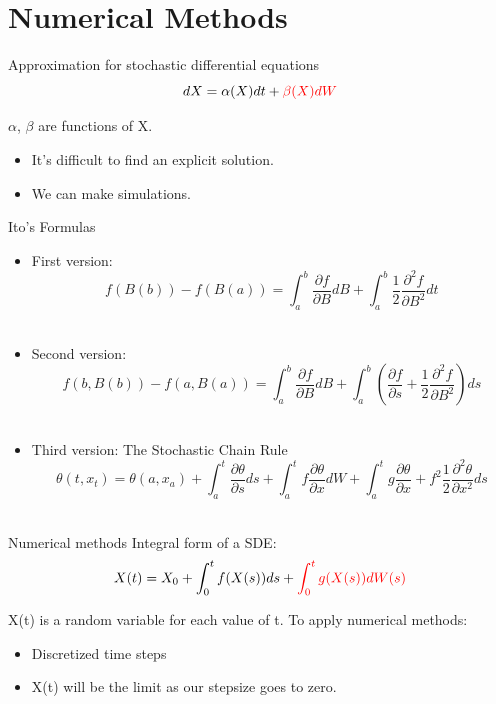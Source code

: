 
\section{Numerical Methods}

\begin{frame}{Approximation for stochastic differential equations}
	\begin{equation*}
	dX=\alpha(X)dt+{\color{red}\beta(X)dW}
	\end{equation*}
	\begin{center}
	$\alpha$, $\beta$ are functions of X.	
	\end{center}
	\begin{itemize}
		\item It's difficult to find an explicit solution.
		\item We can make simulations.
	\end{itemize}
\end{frame}

\begin{frame}{Ito's Formulas}
  	\begin{itemize}
   		\item First version: $$f(B(b))-f(B(a))=\int_{a}^{b}{\frac{\partial f}{\partial B} 				dB}+\int_{a}^{b}{\frac{1}{2} \frac{\partial^2 f}{\partial B^2} dt} $$\\
    		\item Second version: $$f(b,B(b))-f(a,B(a))=\int_{a}^{b}{\frac{\partial f}{\partial B} 			dB}+\int_{a}^{b}{\left(\frac{\partial f}{\partial s}+\frac{1}{2}\frac{\partial^2 f}
    		{\partial B^2}\right) ds}$$\\
    		\item Third version: The Stochastic Chain Rule
    		$$\theta (t,x_t)=\theta(a,x_a)+\int_{a}^{t}\frac{\partial \theta}{\partial s}ds+
    		\int_{a}^{t}f\frac{\partial \theta}{\partial x}dW+
  		\int_{a}^{t}g\frac{\partial \theta}{\partial x}+f^2 \frac{1}{2} \frac{\partial ^2\theta}
  		{\partial x^2}ds$$\\
  	\end{itemize}
\end{frame}

\begin{frame}{Numerical methods}
Integral form of a SDE: 
$$X(t)=X_0+\int_{0}^{t}f(X(s))ds+{\color{red}\int_{0}^{t}g(X(s))dW(s)}$$

X(t) is a random variable for each value of t. To apply numerical methods:
	\begin{itemize}
		\item Discretized time steps	
		\item X(t) will be the limit as our stepsize goes to zero.
	\end{itemize}
\end{frame}


